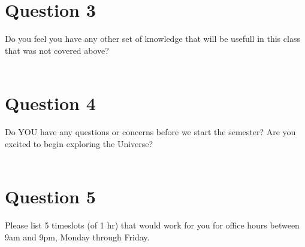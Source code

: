 \documentclass[10pt]{article}
\begin{document}
\section*{Question 3}
\vspace{-0.1in}
Do you feel you have any other set of knowledge that will be usefull in this class that was not covered above? \\ \\

\section*{Question 4}
\vspace{-0.1in}
Do YOU have any questions or concerns before we start the semester? Are you excited to begin exploring the Universe? \\ \\

\section*{Question 5}
Please list 5 timeslots (of 1 hr) that would work for you for office hours between 9am and 9pm, Monday through Friday. \\ \\
\end{document}
